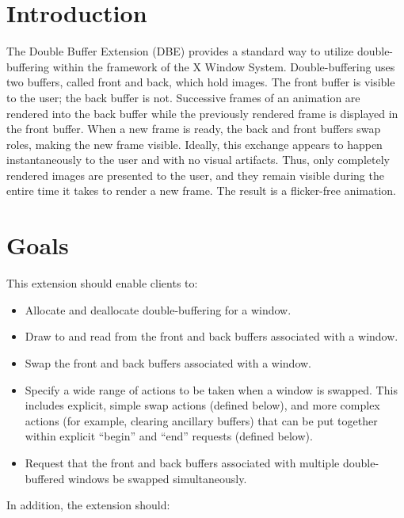 \eject

\section{Introduction}

The Double Buffer Extension (DBE) provides a standard way to utilize
double-buffering within the framework of the X Window System.
Double-buffering uses two buffers, called front and back, which hold
images.  The front buffer is visible to the user; the back buffer is
not.  Successive frames of an animation are rendered into the back
buffer while the previously rendered frame is displayed in the front
buffer.  When a new frame is ready, the back and front buffers swap
roles, making the new frame visible.  Ideally, this exchange appears to
happen instantaneously to the user and with no visual artifacts.  Thus,
only completely rendered images are presented to the user, and they remain
visible during the entire time it takes to render a new frame.  The
result is a flicker-free animation.

\section{Goals}

This extension should enable clients to:
\begin{itemize}

\item Allocate and deallocate double-buffering for a window.

\item Draw to and read from the front and back buffers associated with
a window.

\item Swap the front and back buffers associated with a window.

\item Specify a wide range of actions to be taken when a window is
swapped.  This includes explicit, simple swap actions (defined
below), and more complex actions (for example, clearing ancillary buffers)
that can be put together within explicit ``begin'' and ``end''
requests (defined below).

\item Request that the front and back buffers associated with multiple
double-buffered windows be swapped simultaneously.

\end{itemize}

In addition, the extension should:

